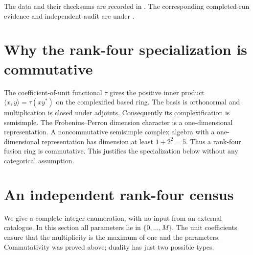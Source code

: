 \documentclass[11pt,a4paper]{article}
\theoremstyle{definition}\newtheorem{definition}[theorem]{Definition}\newtheorem{remark}[theorem]{Remark}
\begin{document}
The data and their checksums are recorded in . The corresponding completed-run evidence and independent audit are under .

\section{Why the rank-four specialization is commutative}
The coefficient-of-unit functional $\tau$ gives the positive inner product
$\langle x,y\rangle=\tau(xy^*)$ on the complexified based ring. The basis is
orthonormal and multiplication is closed under adjoints. Consequently its
complexification is semisimple. The Frobenius--Perron dimension character is a
one-dimensional representation. A noncommutative semisimple complex algebra
with a one-dimensional representation has dimension at least $1+2^2=5$.
Thus a rank-four fusion ring is commutative. This justifies the specialization
below without any categorical assumption.
\section{An independent rank-four census}\label{sec:census}
We give a complete integer enumeration, with no input from an external
catalogue. In this section all parameters lie in $\{0,\ldots,M\}$.
The unit coefficients ensure that the multiplicity is the maximum of one
and the parameters. Commutativity was proved above; duality has just two possible types.
\end{document}
